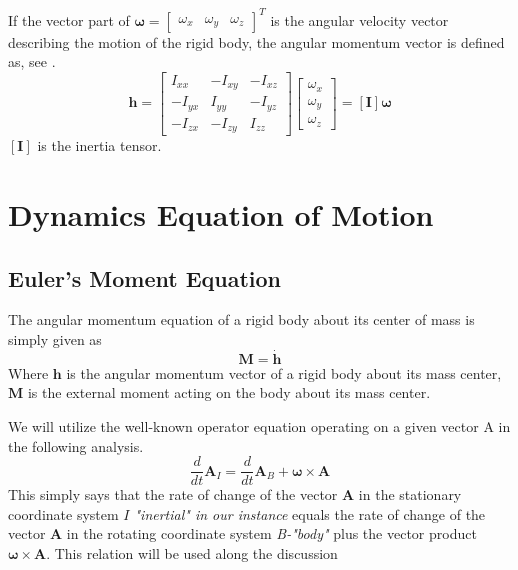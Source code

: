 If the vector part of $\boldsymbol{\omega}=\left[\begin{array}{lll}\omega_{x} & \omega_{y} & \omega_{z}\end{array}\right]^{T}$ is the angular velocity vector describing the motion of the rigid body, the angular momentum vector is defined as, see \cite{sidi1997spacecraft}.
\begin{equation}
\boldsymbol{h}=\left[\begin{array}{ccc}
I_{x x} & -I_{x y} & -I_{x z} \\
-I_{y x} & I_{y y} & -I_{y z} \\
-I_{z x} & -I_{z y} & I_{z z}
\end{array}\right]\left[\begin{array}{l}
\omega_{x} \\
\omega_{y} \\
\omega_{z}
\end{array}\right]=[\mathbf{I}] \boldsymbol{\omega}    
\end{equation}
$[\mathbf{I}]$ is the inertia tensor.

\section{Dynamics Equation of Motion}
\subsection{Euler’s Moment Equation}
The angular momentum equation of a rigid body about its center of mass is simply given as
\begin{equation}
\boldsymbol{M}=\dot{\boldsymbol{h}}    
\end{equation}
Where $\boldsymbol{h}$ is the angular momentum vector of a rigid body about its mass center, $\boldsymbol{M}$ is the external moment acting on the body about its mass center.

We will utilize the well-known operator equation operating on a given vector A in the following analysis.
\begin{equation}
\frac{d}{d t} \boldsymbol{A}_{I}=\frac{d}{d t} \boldsymbol{A}_{B}+\boldsymbol{\omega} \times \boldsymbol{A}
\end{equation}
This simply says that the rate of change of the vector $\boldsymbol{A}$ in the stationary coordinate system \textit{$I$ "inertial" in our instance} equals the rate of change of the vector $\boldsymbol{A}$ in the rotating coordinate system \textit{B-"body"} plus the vector product $\boldsymbol{\omega} \times \boldsymbol{A}$. This relation will be used along the discussion

